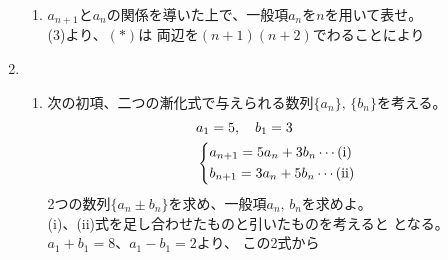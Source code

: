 \documentclass[a4paper]{ltjsarticle}
\begin{document}
\begin{enumerate}[label=\arabic*.]
\begin{enumerate}[label=(\arabic*)]
    \item $a_{n+1}$と$a_n$の関係を導いた上で、一般項$a_n$を$n$を用いて表せ。\\
    (3)より、$(*)$は
    両辺を$(n+1)(n+2)$でわることにより
  \end{enumerate}

\clearpage

  \item
  \begin{enumerate}[label=(\arabic*)]
    \item 次の初項、二つの漸化式で与えられる数列$\{a_n\},\, \{b_n\}$を考える。
      \begin{align*}
        &a_1 = 5,\quad b_1 = 3\\
        &\begin{dcases*}
          a_{n+1} = 5a_n + 3b_n \cdots (\rm{i}) \\
          b_{n+1} = 3a_n + 5b_n \cdots (\rm{ii})
        \end{dcases*}
      \end{align*}
    2つの数列$\{a_n\pm b_n\}$を求め、一般項$a_n,\, b_n$を求めよ。\\

    (i)、(ii)式を足し合わせたものと引いたものを考えると
    となる。$a_1+b_1 = 8$、$a_1-b_1 = 2$より、
    この2式から



\end{enumerate}
\end{enumerate}
\end{document}
